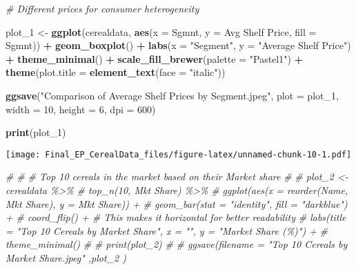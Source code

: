 \documentclass[
]{article}
\newenvironment{Shaded}{\begin{snugshade}}{\end{snugshade}}
\newcommand{\AttributeTok}[1]{\textcolor[rgb]{0.13,0.29,0.53}{#1}}
\newcommand{\CommentTok}[1]{\textcolor[rgb]{0.56,0.35,0.01}{\textit{#1}}}
\newcommand{\DecValTok}[1]{\textcolor[rgb]{0.00,0.00,0.81}{#1}}
\newcommand{\FunctionTok}[1]{\textcolor[rgb]{0.13,0.29,0.53}{\textbf{#1}}}
\newcommand{\NormalTok}[1]{#1}
\newcommand{\OtherTok}[1]{\textcolor[rgb]{0.56,0.35,0.01}{#1}}
\newcommand{\SpecialCharTok}[1]{\textcolor[rgb]{0.81,0.36,0.00}{\textbf{#1}}}
\newcommand{\StringTok}[1]{\textcolor[rgb]{0.31,0.60,0.02}{#1}}
\begin{document}
\begin{Shaded}
\begin{Highlighting}[]
\CommentTok{\# Different prices for consumer heterogeneity}

\NormalTok{plot\_1 }\OtherTok{\textless{}{-}} \FunctionTok{ggplot}\NormalTok{(cerealdata, }\FunctionTok{aes}\NormalTok{(}\AttributeTok{x =}\NormalTok{ Sgmnt, }\AttributeTok{y =} \StringTok{\textasciigrave{}}\AttributeTok{Avg Shelf Price}\StringTok{\textasciigrave{}}\NormalTok{, }\AttributeTok{fill =}\NormalTok{ Sgmnt)) }\SpecialCharTok{+}
  \FunctionTok{geom\_boxplot}\NormalTok{() }\SpecialCharTok{+}
  \FunctionTok{labs}\NormalTok{(}\AttributeTok{x =} \StringTok{"Segment"}\NormalTok{,}
       \AttributeTok{y =} \StringTok{"Average Shelf Price"}\NormalTok{) }\SpecialCharTok{+}
  \FunctionTok{theme\_minimal}\NormalTok{() }\SpecialCharTok{+}
  \FunctionTok{scale\_fill\_brewer}\NormalTok{(}\AttributeTok{palette =} \StringTok{"Pastel1"}\NormalTok{) }\SpecialCharTok{+} 
  \FunctionTok{theme}\NormalTok{(}\AttributeTok{plot.title =} \FunctionTok{element\_text}\NormalTok{(}\AttributeTok{face =} \StringTok{"italic"}\NormalTok{))}

\FunctionTok{ggsave}\NormalTok{(}\StringTok{"Comparison of Average Shelf Prices by Segment.jpeg"}\NormalTok{, }\AttributeTok{plot =}\NormalTok{ plot\_1, }\AttributeTok{width =} \DecValTok{10}\NormalTok{, }\AttributeTok{height =} \DecValTok{6}\NormalTok{, }\AttributeTok{dpi =} \DecValTok{600}\NormalTok{)}

\FunctionTok{print}\NormalTok{(plot\_1)}
\end{Highlighting}
\end{Shaded}

\texttt{[image: Final\_EP\_CerealData\_files/figure-latex/unnamed-chunk-10-1.pdf]}

\begin{Shaded}
\begin{Highlighting}[]
\CommentTok{\# }
\CommentTok{\# \# Top 10 cereals in the market based on their Market share}
\CommentTok{\# }
\CommentTok{\# plot\_2 \textless{}{-} cerealdata \%\textgreater{}\%}
\CommentTok{\#   top\_n(10, \textasciigrave{}Mkt Share\textasciigrave{}) \%\textgreater{}\%}
\CommentTok{\#   ggplot(aes(x = reorder(Name, \textasciigrave{}Mkt Share\textasciigrave{}), y = \textasciigrave{}Mkt Share\textasciigrave{})) +}
\CommentTok{\#   geom\_bar(stat = "identity", fill = "darkblue") +}
\CommentTok{\#   coord\_flip() + \# This makes it horizontal for better readability}
\CommentTok{\#   labs(title = "Top 10 Cereals by Market Share", x = "", y = "Market Share (\%)") +}
\CommentTok{\#   theme\_minimal()}
\CommentTok{\# }
\CommentTok{\# print(plot\_2)}
\CommentTok{\# }
\CommentTok{\# ggsave(filename = "Top 10 Cereals by Market Share.jpeg" ,plot\_2 )}
\end{Highlighting}
\end{Shaded}
\end{document}

